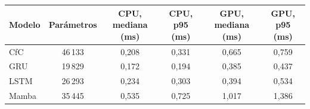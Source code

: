 \begin{tabular}{|l|c|c|c|c|c|}
\hline
\textbf{Modelo} & \textbf{Parámetros} & \textbf{CPU, mediana (ms)} & \textbf{CPU, p95 (ms)} & \textbf{GPU, mediana (ms)} & \textbf{GPU, p95 (ms)} \\ \hline
CfC & 46\,133 & 0{,}208 & 0{,}331 & 0{,}665 & 0{,}759 \\ \hline
GRU & 19\,829 & 0{,}172 & 0{,}194 & 0{,}385 & 0{,}437 \\ \hline
LSTM & 26\,293 & 0{,}234 & 0{,}303 & 0{,}394 & 0{,}534 \\ \hline
Mamba & 35\,445 & 0{,}535 & 0{,}725 & 1{,}017 & 1{,}386 \\ \hline
\end{tabular}
